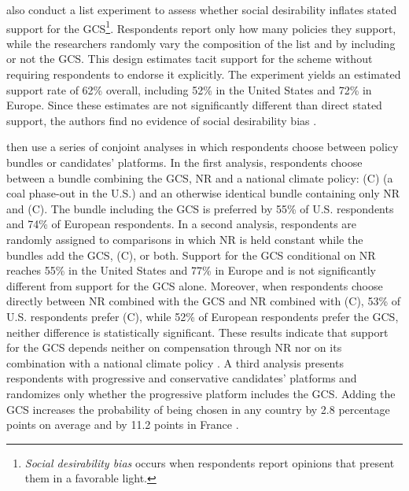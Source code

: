 \citet{fabre_majority_2025} also conduct a list experiment to assess whether social desirability inflates stated support for the GCS\footnote{\textit{Social desirability bias} occurs when respondents report opinions that present them in a favorable light.}. Respondents report only how many policies they support, while the researchers randomly vary the composition of the list and by including or not the GCS. This design estimates tacit support for the scheme without requiring respondents to endorse it explicitly. The experiment yields an estimated support rate of 62\% overall, including 52\% in the United States and 72\% in Europe. Since these estimates are not significantly different than direct stated support, the authors find no evidence of social desirability bias \citep[Table 1]{fabre_majority_2025_si}. 

\citet{fabre_majority_2025} then use a series of conjoint analyses in which respondents choose between policy bundles or candidates' platforms. In the first analysis, respondents choose between a bundle combining the GCS, NR and a national climate policy: (C) (a coal phase-out in the U.S.) and an otherwise identical bundle containing only NR and (C). The bundle including the GCS is preferred by 55\% of U.S. respondents and 74\% of European respondents. 
In a second analysis, respondents are randomly assigned to comparisons in which NR is held constant while the bundles add the GCS, (C), or both. Support for the GCS conditional on NR reaches 55\% in the United States and 77\% in Europe and is not significantly different from support for the GCS alone. Moreover, when respondents choose directly between NR combined with the GCS and NR combined with (C), 53\% of U.S. respondents prefer (C), while 52\% of European respondents prefer the GCS, neither difference is statistically significant. These results indicate that support for the GCS depends neither on compensation through NR nor on its combination with a national climate policy \citep[Figure S8]{fabre_majority_2025}. 
A third analysis presents respondents with progressive and conservative candidates' platforms and randomizes only whether the progressive platform includes the GCS. Adding the GCS increases the probability of being chosen in any country by 2.8 percentage points on average and by 11.2 points in France \citep[Supplementary Table 2]{fabre_majority_2025}.


